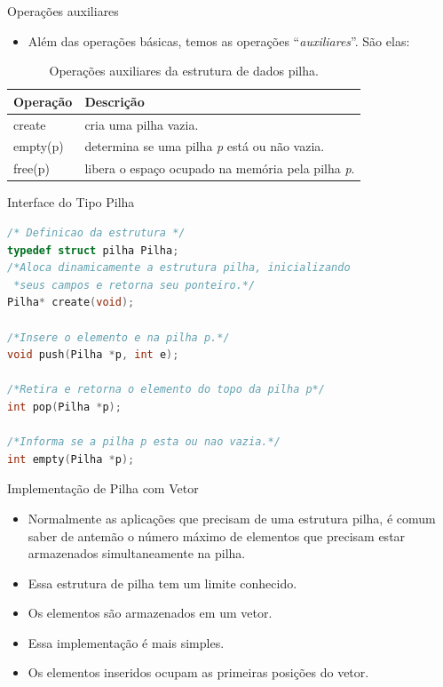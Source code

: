    \begin{frame}{Operações auxiliares}   
			\begin{itemize}
				\item Além das operações básicas, temos as operações ``\textit{auxiliares}''. São elas:
			\end{itemize}
			\begin{table}[ht]
			  \centering
						\begin{tabular}{l|l}
						    \hline \textbf{Operação} & \textbf{Descrição} \\
						    \hline create & cria uma pilha vazia.\\
						    \hline empty(p) & determina se uma pilha \textit{p} está ou não vazia.\\
						    \hline free(p) & libera o espaço ocupado na memória pela pilha \textit{p}.\\
						    \hline 
						\end{tabular}
						\caption{Operações auxiliares da estrutura de dados pilha.}
				\end{table}
  \end{frame}
  
\begin{frame}{Interface do Tipo Pilha}
\begin{lstlisting}[language=C]
/* Definicao da estrutura */
typedef struct pilha Pilha;
/*Aloca dinamicamente a estrutura pilha, inicializando
 *seus campos e retorna seu ponteiro.*/
Pilha* create(void);

/*Insere o elemento e na pilha p.*/
void push(Pilha *p, int e);

/*Retira e retorna o elemento do topo da pilha p*/
int pop(Pilha *p);

/*Informa se a pilha p esta ou nao vazia.*/
int empty(Pilha *p);

\end{lstlisting}
\end{frame}

\begin{frame}{Implementação de Pilha com Vetor}  
	\begin{itemize}
		\item Normalmente as aplicações que precisam de uma estrutura pilha, é comum saber de antemão o número máximo de elementos que precisam estar armazenados simultaneamente na pilha.
		\item Essa estrutura de pilha tem um limite conhecido.
		\item Os elementos são armazenados em um vetor.
		\item Essa implementação é mais simples.
		\item Os elementos inseridos ocupam as primeiras posições do vetor. 
	\end{itemize}
\end{frame}

